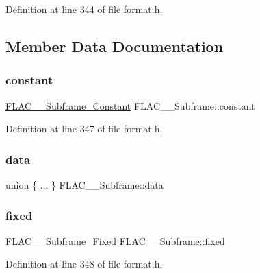 Definition at line 344 of file format.\+h.



\subsection{Member Data Documentation}
\mbox{\label{struct_f_l_a_c_____subframe_a2b6c0b6a78e11a3f07ad018ebdbae053}} 
\subsubsection{\texorpdfstring{constant}{constant}}
{\footnotesize\ttfamily \mbox{\hyperlink{struct_f_l_a_c_____subframe___constant}{F\+L\+A\+C\+\_\+\+\_\+\+Subframe\+\_\+\+Constant}} F\+L\+A\+C\+\_\+\+\_\+\+Subframe\+::constant}



Definition at line 347 of file format.\+h.

\mbox{\label{struct_f_l_a_c_____subframe_a18e4a6dcea5c177099c2b5e85365450a}} 
\subsubsection{\texorpdfstring{data}{data}}
{\footnotesize\ttfamily union \{ ... \}   F\+L\+A\+C\+\_\+\+\_\+\+Subframe\+::data}

\mbox{\label{struct_f_l_a_c_____subframe_a62b0c96288ec264ca09aba6c7c26fc0b}} 
\subsubsection{\texorpdfstring{fixed}{fixed}}
{\footnotesize\ttfamily \mbox{\hyperlink{struct_f_l_a_c_____subframe___fixed}{F\+L\+A\+C\+\_\+\+\_\+\+Subframe\+\_\+\+Fixed}} F\+L\+A\+C\+\_\+\+\_\+\+Subframe\+::fixed}



Definition at line 348 of file format.\+h.

\mbox{\label{struct_f_l_a_c_____subframe_a298cb7680a387b1b95815cd51648f400}} 
